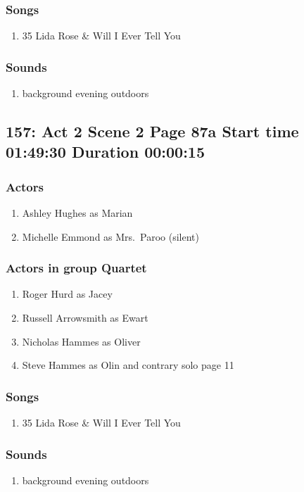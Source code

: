 \subsubsection{Songs}
\begin{enumerate}
\item 35 Lida Rose \& Will I Ever Tell You
\end{enumerate}\subsubsection{Sounds}
\begin{enumerate}
\item background evening outdoors
\end{enumerate}
\subsection{157: Act 2 Scene 2 Page 87a Start time 01:49:30 Duration 00:00:15}

\subsubsection{Actors}
\begin{enumerate}
\item Ashley Hughes as Marian
\item Michelle Emmond as Mrs.~Paroo (silent)
\end{enumerate}
\subsubsection{Actors in group Quartet}
\begin{enumerate}
\item Roger Hurd as Jacey
\item Russell Arrowsmith as Ewart
\item Nicholas Hammes as Oliver
\item Steve Hammes as Olin and contrary solo page 11
\end{enumerate}

\subsubsection{Songs}
\begin{enumerate}
\item 35 Lida Rose \& Will I Ever Tell You
\end{enumerate}\subsubsection{Sounds}
\begin{enumerate}
\item background evening outdoors
\end{enumerate}
